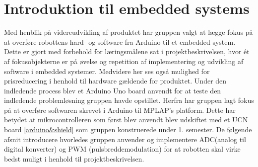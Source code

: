\section{Introduktion til embedded systems}
Med henblik på videreudvikling af produktet har gruppen valgt at lægge fokus på at overføre robottens hard- og software fra Arduino til et embedded system. Dette er gjort med forbehold for læringsmålene sat i projektbeskrivelsen, hvor ét af fokusobjekterne er på øvelse og repetition af implementering og udvikling af software i embedded systemer. 
\newline 
\newline 
Medvidere her ses også mulighed for prisreducering i henhold til hardware gældende for produktet. Under den indledende process blev et Arduino Uno board anvendt for at teste den indledende problemløsning gruppen havde opstillet. Herfra har gruppen lagt fokus på at overføre softwaren skrevet i Arduino til MPLAP's platform. Dette har betydet at mikrocontrolleren som først blev anvendt blev udskiftet med et UCN board \ref{arduino&shield} som gruppen konstruerede under 1. semester. 
\newline
\newline
De følgende afsnit introducere hvorledes gruppen anvender og implementere ADC(analog til digital konverter) og PWM (pulsbreddemodulation) for at robotten skal virke bedst muligt i henhold til projektbeskrivelsen.  
   





